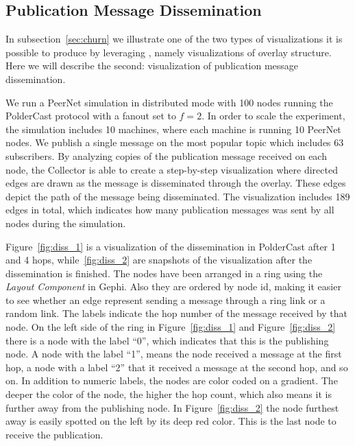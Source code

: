 \subsection{Publication Message Dissemination}
\label{sec:dissviz}

In subsection~\ref{sec:churn} we illustrate one of the two types of
visualizations it is possible to produce by leveraging \demo, namely
visualizations of overlay structure. Here we will describe the second:
visualization of publication message dissemination.

We run a PeerNet simulation in distributed mode with 100 nodes running
the PolderCast protocol with a fanout set to $f=2$. In order to scale
the experiment, the simulation includes 10 machines, where each machine
is running 10 PeerNet nodes. We publish a single message on the
most popular topic which includes 63 subscribers. By analyzing copies of
the publication message received on each node, the Collector is able to
create a step-by-step visualization where directed edges are drawn as
the message is disseminated through the overlay. These edges depict the
path of the message being disseminated. The visualization includes 189
edges in total, which indicates how many publication messages was sent
by all nodes during the simulation.

Figure~\ref{fig:diss_1} is a visualization of the dissemination in
PolderCast after 1 and 4 hops, while~\ref{fig:diss_2} are snapshots of
the visualization after the dissemination is finished.  The nodes have
been arranged in a ring using the \emph{Layout Component} in Gephi. Also
they are ordered by node id, making it easier to see whether an edge
represent sending a message through a ring link or a random link. The
labels indicate the hop number of the message received by that node. On
the left side of the ring in Figure~\ref{fig:diss_1} and
Figure~\ref{fig:diss_2} there is a node with the label ``0'', which
indicates that this is the publishing node. A node with the label ``1'',
means the node received a message at the first hop, a node with a label
``2'' that it received a message at the second hop, and so on. In
addition to numeric labels, the nodes are color coded on a gradient. The
deeper the color of the node, the higher the hop count, which also means
it is further away from the publishing node. In Figure~\ref{fig:diss_2} the
node furthest away is easily spotted on the left by its deep red color.
This is the last node to receive the publication.

